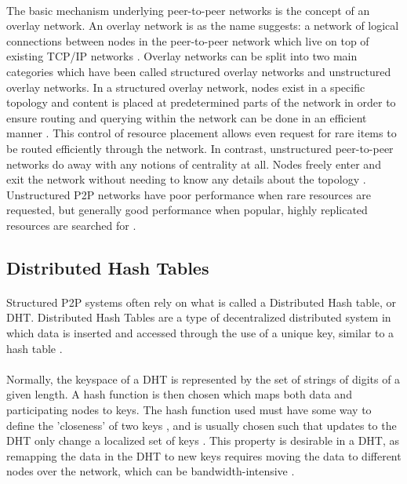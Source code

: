 \documentclass[12pt,letterpaper]{article}
\begin{document}
\paragraph{}
The basic mechanism underlying peer-to-peer networks is the concept of an overlay network.
An overlay network is as the name suggests: a network of logical connections between nodes in the peer-to-peer network which live on top of existing TCP/IP networks \cite{overlay}.
Overlay networks can be split into two main categories which have been called structured overlay networks and unstructured overlay networks.
In a structured overlay network, nodes exist in a specific topology and content is placed at predetermined parts of the network in order to ensure routing and querying within the network can be done in an efficient manner \cite{overlay}.
This control of resource placement allows even request for rare items to be routed efficiently through the network.
In contrast, unstructured peer-to-peer networks do away with any notions of centrality at all.
Nodes freely enter and exit the network without needing to know any details about the topology \cite{overlay}.
Unstructured P2P networks have poor performance when rare resources are requested, but generally good performance when popular, highly replicated resources are searched for \cite{overlay}.

\subsection{Distributed Hash Tables}
\label{DHT}

\paragraph{}
Structured P2P systems often rely on what is called a Distributed Hash table, or DHT.
Distributed Hash Tables are a type of decentralized distributed system in which data is inserted and accessed through the use of a unique key, similar to a hash table \cite{dht}\cite{wiki-dht}.

\paragraph{}
Normally, the keyspace of a DHT is represented by the set of strings of digits of a given length.
A hash function is then chosen which maps both data and participating nodes to keys.
The hash function used must have some way to define the 'closeness' of two keys \cite{dht}, and is usually chosen such that updates to the DHT only change a localized set of keys \cite{wiki-dht}.
This property is desirable in a DHT, as remapping the data in the DHT to new keys requires moving the data to different nodes over the network, which can be bandwidth-intensive \cite{wiki-dht}.
\end{document}
